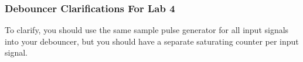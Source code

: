 \documentclass[11pt]{article}
\begin{document}
\subsubsection{Debouncer Clarifications For Lab 4}
To clarify, you should use the same sample pulse generator for all input signals into your debouncer, but you should have a separate saturating counter per input signal. \\




\end{document}
